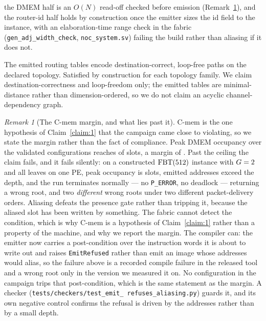 \documentclass[journal,10pt]{IEEEtran}
\theoremstyle{plain}
\theoremstyle{definition}
\theoremstyle{remark}
\newtheorem*{remark}{Remark}
\newcommand{\FBT}{\ensuremath{\mathrm{FBT}}}
\newcommand{\sv}[1]{\texttt{#1}}
\begin{document}
\begin{description}[leftmargin=2.2em,style=nextline]
  the DMEM half is an $O(N)$ read-off checked before emission
  (Remark~\ref{rem:cmem}), and the router-id half holds by construction once
  the emitter sizes the id field to the instance, with an elaboration-time
  range check in the fabric (\sv{gen\_adj\_width\_check},
  \sv{noc\_system.sv}) failing the build rather than aliasing if it does
  not.
\item[$\dagger$\,\textsf{C-route} (Routing-table soundness).] The emitted
  routing tables encode destination-correct, loop-free paths on the
  declared topology. Satisfied by construction for each topology family.
  We claim destination-correctness and loop-freedom only; the emitted
  tables are minimal-distance rather than dimension-ordered, so we do not
  claim an acyclic channel-dependency graph.
\end{description}

\begin{remark}[The \textsf{C-mem} margin, and what lies past it]
\label{rem:cmem}
\textsf{C-mem} is the one hypothesis of Claim~\ref{claim:1} that the
campaign came close to violating, so we state the margin rather than the
fact of compliance. Peak DMEM occupancy over the validated configurations
reaches \DmemPeakMax{} of \DmemDepth{} slots, a margin of \DmemMargin{}.
Past the ceiling the claim fails, and it fails silently: on a constructed
$\FBT(\DmemCexLeaves)$ instance with $G=2$ and all leaves on
one PE, peak occupancy is \DmemCexPeak{} slots, \DmemCexOver{} emitted
addresses exceed the depth, and the run terminates normally --- no
\texttt{P\_ERROR}, no deadlock --- returning a wrong root, and two
\emph{different} wrong roots under two different packet-delivery orders.
Aliasing defeats the presence gate rather than tripping it, because the
aliased slot has been written by something. The fabric cannot detect the
condition, which is why \textsf{C-mem} is a hypothesis of Claim~\ref{claim:1}
rather than a property of the machine, and why we report the margin. The
compiler can: the emitter now carries a post-condition over the instruction
words it is about to write out and raises \sv{EmitRefused} rather than emit an
image whose addresses would alias, so the failure above is a recorded compile
failure in the released tool and a wrong root only in the version we measured
it on. No configuration in the campaign trips that post-condition, which is
the same statement as the margin. A
checker (\sv{tests/checkers/\allowbreak test\_emit\_\allowbreak
refuses\_aliasing.py}) guards it, and its own negative control confirms the
refusal is driven by the addresses rather than by a small depth.
\end{remark}
\end{document}
